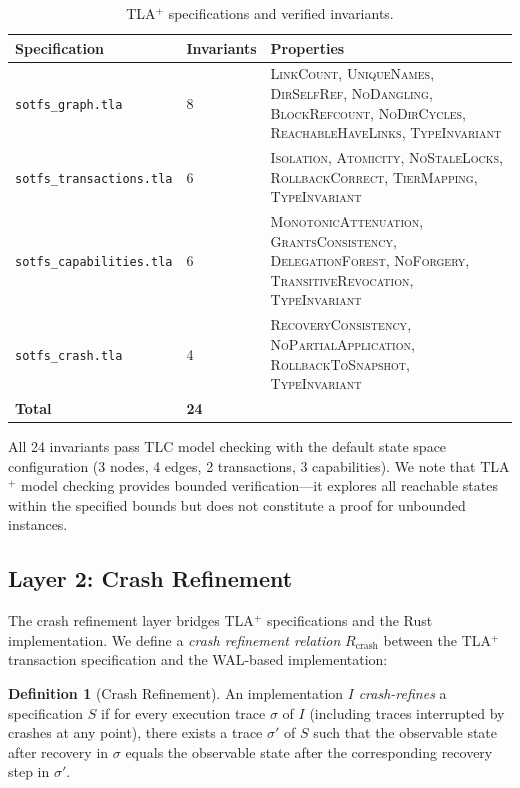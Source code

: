 \documentclass[11pt,a4paper]{article}
\theoremstyle{definition}
\newtheorem{definition}{Definition}[section]
\theoremstyle{remark}
\begin{document}
\begin{table}[H]
\centering
\caption{TLA$^+$ specifications and verified invariants.}
\label{tab:tla}
\small
\begin{tabular}{@{}llp{6.4cm}@{}}
\toprule
\textbf{Specification} & \textbf{Invariants} & \textbf{Properties} \\
\midrule
\texttt{sotfs\_graph.tla} & 8 &
  \textsc{LinkCount}, \textsc{UniqueNames},
  \textsc{DirSelfRef}, \textsc{NoDangling},
  \textsc{BlockRefcount}, \textsc{NoDirCycles},
  \textsc{ReachableHaveLinks}, \textsc{TypeInvariant} \\
\addlinespace
\texttt{sotfs\_transactions.tla} & 6 &
  \textsc{Isolation}, \textsc{Atomicity},
  \textsc{NoStaleLocks}, \textsc{RollbackCorrect},
  \textsc{TierMapping}, \textsc{TypeInvariant} \\
\addlinespace
\texttt{sotfs\_capabilities.tla} & 6 &
  \textsc{MonotonicAttenuation}, \textsc{GrantsConsistency},
  \textsc{DelegationForest}, \textsc{NoForgery},
  \textsc{TransitiveRevocation}, \textsc{TypeInvariant} \\
\addlinespace
\texttt{sotfs\_crash.tla} & 4 &
  \textsc{RecoveryConsistency},
  \textsc{NoPartialApplication},
  \textsc{RollbackToSnapshot}, \textsc{TypeInvariant} \\
\midrule
\textbf{Total} & \textbf{24} & \\
\bottomrule
\end{tabular}
\end{table}

All 24 invariants pass TLC model checking with the default state space
configuration (3 nodes, 4 edges, 2 transactions, 3 capabilities). We
note that TLA$^+$ model checking provides bounded verification---it
explores all reachable states within the specified bounds but does not
constitute a proof for unbounded instances.

\subsection{Layer 2: Crash Refinement}
\label{sec:verif-crash}

The crash refinement layer bridges TLA$^+$ specifications and the
Rust implementation. We define a \emph{crash refinement relation}
$R_{\mathrm{crash}}$ between the TLA$^+$ transaction specification
and the WAL-based implementation:

\begin{definition}[Crash Refinement]
\label{def:crash-refinement}
An implementation $I$ \emph{crash-refines} a specification $S$ if for
every execution trace $\sigma$ of $I$ (including traces interrupted by
crashes at any point), there exists a trace $\sigma'$ of $S$ such that
the observable state after recovery in $\sigma$ equals the observable
state after the corresponding recovery step in $\sigma'$.
\end{definition}
\end{document}
